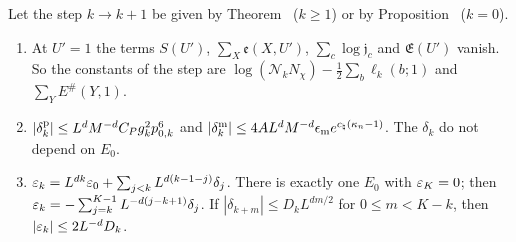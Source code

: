 \begin{detail}\label{xb:d-vacuum}
Let the step $k\to k+1$ be given by Theorem~ ($k\ge1$) or by Proposition~ ($k=0$).
\begin{enumerate}[label=(\alph*)]
\item At $U'=1$ the terms $S(U')$, $\sum_X\mathfrak e(X,U')$, $\sum_c\log\mathfrak j_c$ and $\mathfrak E(U')$ vanish. So the constants of the step are $\log(\mathcal N_kN_\chi)-\frac12\sum_b\ell_k(b;1)$ and $\sum_YE^\#(Y,1)$.
\item $|\delta^{\rm p}_k|\le L^dM^{-d}C_Pg_k^2p_{0,k}^6$ and $|\delta^{\rm m}_k|\le4AL^dM^{-d}\epsilon_{\rm m}e^{c_\natural(\kappa_n-1)}$. The $\delta_k$ do not depend on $E_0$.
\item $\varepsilon_k=L^{dk}\varepsilon_0+\sum_{j<k}L^{d(k-1-j)}\delta_j$. There is exactly one $E_0$ with $\varepsilon_K=0$; then $\varepsilon_k=-\sum_{j=k}^{K-1}L^{-d(j-k+1)}\delta_j$. If $|\delta_{k+m}|\le D_kL^{dm/2}$ for $0\le m<K-k$, then $|\varepsilon_k|\le2L^{-d}D_k$.
\end{enumerate}
\end{detail}

